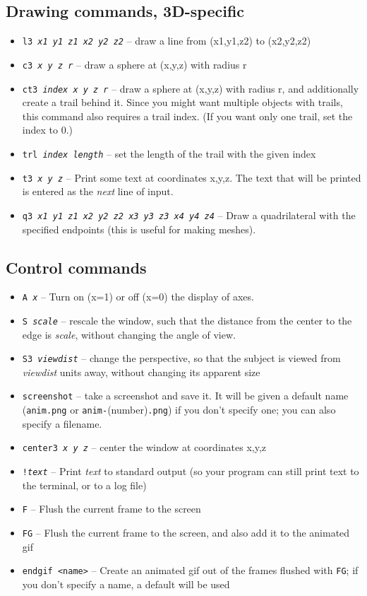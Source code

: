 \documentclass[12pt]{article}
\begin{document}
\subsection{Drawing commands, 3D-specific}
\begin{itemize}

\item {\tt l3 {\it x1 y1 z1 x2 y2 z2}} -- draw a line from (x1,y1,z2) to (x2,y2,z2)
\item {\tt c3 {\it x y z r}} -- draw a sphere at (x,y,z) with radius r
\item {\tt ct3 {\it index x y z r}} -- draw a sphere at (x,y,z) with radius r, and additionally create a trail behind it. Since you might want 
  multiple objects with trails, this command also requires a trail index. (If you want only one trail, set the index to 0.)
\item {\tt trl {\it index length}} -- set the length of the trail with the given index
\item {\tt t3 {\it x y z}} -- Print some text at coordinates x,y,z. The text that will be printed is entered as the {\it next} line of input.
\item {\tt q3 {\it x1 y1 z1 x2 y2 z2 x3 y3 z3 x4 y4 z4}} -- Draw a quadrilateral with the specified endpoints (this is useful for making meshes). 
\end{itemize}

\subsection{Control commands}
\begin{itemize}
\item {\tt A {\it x}} -- Turn on (x=1) or off (x=0) the display of axes. 
\item {\tt S {\it scale}} -- rescale the window, such that the distance from the center to the edge is {\it scale}, without changing
the angle of view.
\item {\tt S3 {\it viewdist}} -- change the perspective, so that the subject is viewed from {\it viewdist} units away, without changing 
its apparent size
\item {\tt screenshot} -- take a screenshot and save it. It will be given a default name ({\tt anim.png}
or {\tt anim-}(number){\tt.png}) if you don't specify one; you can also specify a filename.
\item {\tt center3 {\it x y z}} -- center the window at coordinates x,y,z
\item {\tt !{\it text}} -- Print {\it text} to standard output (so your program can still print text to the terminal, or to a log file)
\item {\tt F} -- Flush the current frame to the screen
\item {\tt FG} -- Flush the current frame to the screen, and also add it to the animated gif
\item {\tt endgif <name>} -- Create an animated gif out of the frames flushed with {\tt FG}; if you don't specify a name, a default will be used

\end{itemize}
\end{document}
